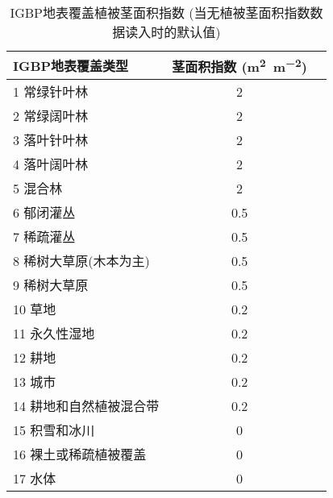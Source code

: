 \begin{table}[htbp]
  \centering
  \caption[IGBP地表覆盖植被茎面积指数]{IGBP地表覆盖植被茎面积指数 (当无植被茎面积指数数据读入时的默认值)}
  \label{tab:IGBP地表覆盖植被茎面积指数}
  \begin{tabular}{@{}lcc@{}}
    \toprule
    IGBP地表覆盖类型        & 茎面积指数 (\unit{m^2.m^{-2}}) \\ \midrule
    1 常绿针叶林            & 2                              \\
    2 常绿阔叶林            & 2                              \\
    3 落叶针叶林            & 2                              \\
    4 落叶阔叶林            & 2                              \\
    5 混合林                & 2                              \\
    6 郁闭灌丛              & 0.5                            \\
    7 稀疏灌丛              & 0.5                            \\
    8 稀树大草原(木本为主)  & 0.5                            \\
    9 稀树大草原            & 0.5                            \\
    10 草地                 & 0.2                            \\
    11 永久性湿地           & 0.2                            \\
    12 耕地                 & 0.2                            \\
    13 城市                 & 0.2                            \\
    14 耕地和自然植被混合带 & 0.2                            \\
    15 积雪和冰川           & 0                              \\
    16 裸土或稀疏植被覆盖   & 0                              \\
    17 水体                 & 0                              \\ \bottomrule
  \end{tabular}
\end{table}

